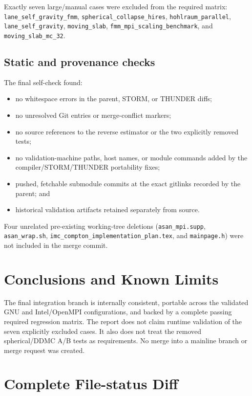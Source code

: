 \documentclass[10pt,a4paper]{article}
\newcommand{\file}[1]{\nolinkurl{#1}}
\begin{document}
Exactly seven large/manual cases were excluded from the required matrix:
\file{lane_self_gravity_fmm}, \file{spherical_collapse_hires},
\file{hohlraum_parallel}, \file{lane_self_gravity}, \file{moving_slab},
\file{fmm_mpi_scaling_benchmark}, and \file{moving_slab_mc_32}.

\subsection{Static and provenance checks}

The final self-check found:
\begin{itemize}
  \item no whitespace errors in the parent, STORM, or THUNDER diffs;
  \item no unresolved Git entries or merge-conflict markers;
  \item no source references to the reverse estimator or the two explicitly
        removed tests;
  \item no validation-machine paths, host names, or module commands added by
        the compiler/STORM/THUNDER portability fixes;
  \item pushed, fetchable submodule commits at the exact gitlinks recorded by
        the parent; and
  \item historical validation artifacts retained separately from source.
\end{itemize}

Four unrelated pre-existing working-tree deletions
(\file{asan_mpi.supp}, \file{asan_wrap.sh},
\file{imc_compton_implementation_plan.tex}, and \file{mainpage.h}) were not
included in the merge commit.

\section{Conclusions and Known Limits}

The final integration branch is internally consistent, portable across the
validated GNU and Intel/OpenMPI configurations, and backed by a complete
passing required regression matrix.  The report does not claim runtime
validation of the seven explicitly excluded cases.  It also does not treat
the removed spherical/DDMC A/B tests as requirements.  No merge into a mainline
branch or merge request was created.

\clearpage
\appendix
\section{Complete File-status Diff}
\end{document}
